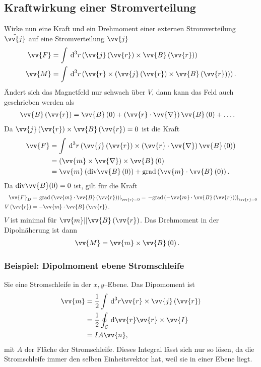 \documentclass[a4paper,12pt]{article}
\newcommand{\td}{\,\text{d}}
\numberwithin{equation}{section}
\begin{document}
\subsection{Kraftwirkung einer Stromverteilung}
Wirke nun eine Kraft und ein Drehmoment einer externen Stromverteilung $\tilde{\vv{j}}$ auf eine Stromverteilung $\vv{j}$
\begin{align} 
        \vv{F}&=\int_{}^{}\td ^3r\left(\vv{j}\left(\vv{r}\right)\times \vv{B}\left(\vv{r}\right)\right)\\
        \vv{M}&=\int_{}^{}\td ^3r\left(\vv{r}\times \left(\vv{j}\left(\vv{r}\right)\times \vv{B}\left(\vv{r}\right)\right)\right)
.\end{align} 
Ändert sich das Magnetfeld nur schwach über $V$, dann kann das Feld auch geschrieben werden als
\begin{align} 
        \vv{B}\left(\vv{r}\right)&=\vv{B}\left(0\right)+\left(\vv{r}\cdot \vv{\nabla }\right)\vv{B}\left(0\right)+\hdots 
.\end{align} 
Da $\vv{j}\left(\vv{r}\right)\times \vv{B}\left(\vv{r}\right)=0$ ist die Kraft
\begin{align} 
        \vv{F}&=\int_{}^{}\td ^3r\left(\vv{j}\left(\vv{r}\right)\times \left(\vv{r}\cdot \vv{\nabla }\right)\vv{B}\left(0\right)\right)\\
              &=\left(\vv{m}\times \vv{\nabla }\right)\times \vv{B}\left(0\right)\\
              &=\vv{m}\left(\text{div}\vv{B}\left(0\right)\right)+\text{grad}\left(\vv{m}\cdot \vv{B}\left(0\right)\right)
.\end{align} 
Da $\text{div}\vv{B}(0)=0$ ist, gilt für die Kraft
\begin{align} 
        \vv{F}_D&=\left.\text{grad}\left(\vv{m}\cdot \vv{B}\left(\vv{r}\right)\right)\right|_{\vv{r}=0}=\left.-\text{grad}\left(-\vv{m}\cdot \vv{B}\left(\vv{r}\right)\right)\right|_{\vv{r}=0}\\
                        V\left(\vv{r}\right)&=-\vv{m}\cdot \vv{B}\left(\vv{r}\right)
.\end{align} 
$V$ ist minimal für $\vv{m}| |\vv{B}\left(\vv{r}\right)$. Das Drehmoment in der Dipolnäherung ist dann
\begin{align} 
        \vv{M}&=\vv{m}\times \vv{B}\left(0\right)
.\end{align} 

\subsubsection{Beispiel: Dipolmoment ebene Stromschleife}
Sie eine Stromschleife in der $x,y$--Ebene. Das Dipomoment ist
\begin{align} 
        \vv{m}&=\dfrac{1}{2}\int_{}^{}\td ^3r\vv{r}\times \vv{j}\left(\vv{r}\right)\\
              &=\dfrac{1}{2}\oint_{\mathcal{C}}^{}\td \vv{r}\vv{r}\times \vv{I}\\
              &=IA\vv{n}
,\end{align} 
mit $A$ der Fläche der Stromschleife.
Dieses Integral lässt sich nur so lösen, da die Stromschleife immer den selben Einheitsvektor hat, weil sie in einer Ebene liegt.
\end{document}
